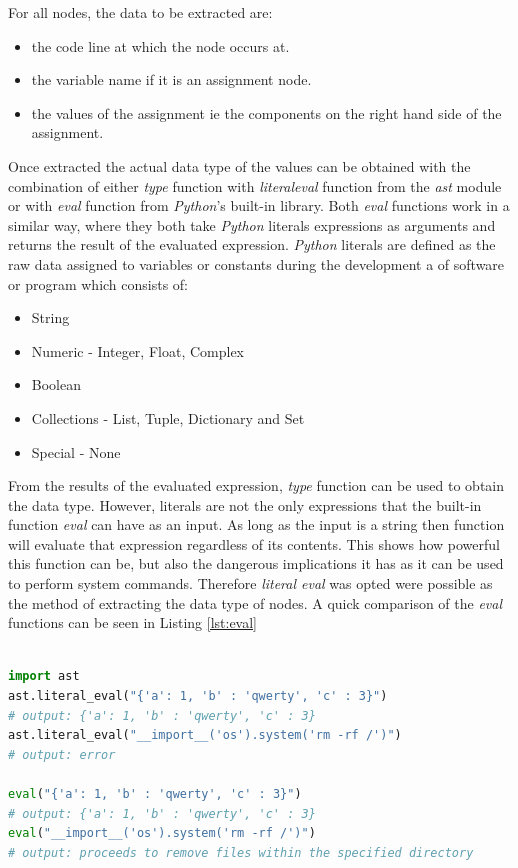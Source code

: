 \documentclass{l4proj}
\begin{document}
\clearpage
For all nodes, the data to be extracted are:
\begin{itemize}
    \item the code line at which the node occurs at.
    \item the variable name if it is an assignment node.
    \item the values of the assignment ie the components on the right hand side of the assignment.
\end{itemize}
Once extracted the actual data type of the values can be obtained with the combination of either \textit{type} function with \textit{literal\textunderscore eval} function from the \textit{ast} module or with \textit{eval} function from \emph{Python}'s built-in library. Both \textit{eval} functions work in a similar way, where they both take \emph{Python} literals expressions as arguments and returns the result of the evaluated expression. \emph{Python} literals are defined as the raw data assigned to variables or constants during the development a of software or program which consists of:

\begin{itemize}
    \item String 
    \item Numeric  - Integer, Float, Complex
    \item Boolean 
    \item Collections - List, Tuple, Dictionary and Set
    \item Special - None
\end{itemize} 

From the results of the evaluated expression, \textit{type} function can be used to obtain the data type. However, literals are not the only expressions that the built-in function \textit{eval} can have as an input. As long as the input is a string then function will evaluate that expression regardless of its contents. This shows how powerful this function can be, but also the dangerous implications it has as it can be used to perform system commands. Therefore \textit{literal \textunderscore eval} was opted were possible as the method of extracting the data type of nodes. A quick comparison of the \textit{eval} functions can be seen in Listing \ref{lst:eval}

\begin{lstlisting}[language=Python, caption= Comparison of \textbf{literal\textunderscore eval()} and \textbf{eval()}, label = {lst:eval}]

import ast
ast.literal_eval("{'a': 1, 'b' : 'qwerty', 'c' : 3}")
# output: {'a': 1, 'b' : 'qwerty', 'c' : 3}
ast.literal_eval("__import__('os').system('rm -rf /')") 
# output: error

eval("{'a': 1, 'b' : 'qwerty', 'c' : 3}")
# output: {'a': 1, 'b' : 'qwerty', 'c' : 3}
eval("__import__('os').system('rm -rf /')") 
# output: proceeds to remove files within the specified directory
\end{lstlisting}
\end{document}
